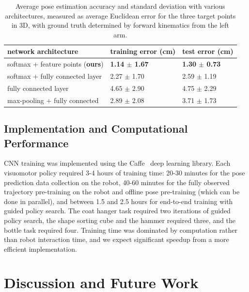 \documentclass[conference]{IEEEtran}
\begin{document}
\begin{table}[h!]
  \begin{center}
    \begin{tabular}{| l | l | l | }
    \hline
    network architecture & training error (cm) & test error (cm)  \\
    \hline
    softmax + feature points ({\bf ours}) & {\bf 1.14 $\pm$ 1.67}  & {\bf 1.30 $\pm$ 0.73} \\
    \hline
    softmax + fully connected layer & 2.27 $\pm$ 1.70 & 2.59 $\pm$ 1.19 \\
    \hline
    fully connected layer & 4.65 $\pm$ 2.90  & 4.75 $\pm$ 2.29  \\
    \hline
    max-pooling + fully connected & 2.89 $\pm$ 2.08 & 3.71 $\pm$ 1.73 \\
    \hline
    \end{tabular}
  \end{center}
\vspace{-0.1in}
  \caption{Average pose estimation accuracy and standard deviation with various architectures, measured as average Euclidean error for the three target points in 3D, with ground truth determined by forward kinematics from the left arm.
}
  \label{tbl:posebaseline}
\vspace{-0.05in}
\end{table}

\subsection{Implementation and Computational Performance}

CNN training was implemented using the Caffe~\cite{jsdkl-caffe-14} deep learning library. Each visuomotor policy required 3-4 hours of training time: 20-30 minutes for the pose prediction data collection on the robot, 40-60 minutes for the fully observed trajectory pre-training on the robot and offline pose pre-training (which can be done in parallel), and between 1.5 and 2.5 hours for end-to-end training with guided policy search. The coat hanger task required two iterations of guided policy search, the shape sorting cube and the hammer required three, and the bottle task required four. Training time was dominated by computation rather than robot interaction time, and we expect significant speedup from a more efficient implementation.

\section{Discussion and Future Work}
\label{sec:conclusion}
\end{document}
